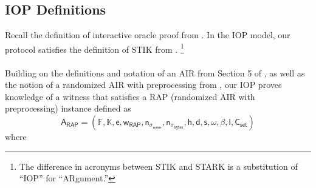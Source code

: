 \documentclass[10pt,letterpaper,titlepage]{article}
\theoremstyle{definition}
\begin{document}
\subsection{IOP Definitions}
Recall the definition of interactive oracle proof from \cite{iop}.
In the IOP model, our protocol satisfies the definition of STIK from \cite{stark}.%
\footnote{The difference in acronyms between STIK and STARK is a substitution of ``IOP'' for ``ARgument.''}
\\
\label{IOP notation}
\label{AIR}
\\
Building on the definitions and notation of an AIR from Section 5 of \cite{ethSTARK}, as well as the notion of a randomized AIR with preprocessing from \cite{RAP}, our IOP proves knowledge of a witness that satisfies a RAP\cite{RAP} (randomized AIR with preprocessing) instance defined as
\[\mathsf{A_{RAP}} = (
  \mathbb{F},
  \mathbb{K},
  \mathsf{e},
  \mathsf{w}_\mathsf{RAP},
  \mathsf{n}_{\sigma_\mathsf{mem}},
  \mathsf{n}_{\sigma_\mathsf{bytes}},
  \mathsf{h},
  \mathsf{d},
  \mathsf{s},
  \omega,
  \beta,
  \mathsf{l},
  \mathsf{C}_\mathsf{set})\] where
\end{document}
